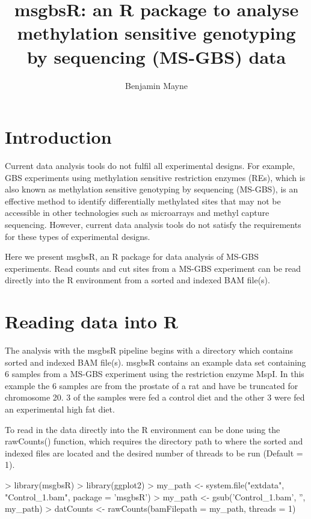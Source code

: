 \documentclass{article}
\begin{document}


\title{msgbsR: an R package to analyse methylation sensitive genotyping by sequencing (MS-GBS) data}
\author{Benjamin Mayne}
\maketitle

\tableofcontents

\clearpage

\section{Introduction}

Current data analysis tools do not fulfil all experimental designs. For example, GBS experiments using methylation sensitive restriction enzymes (REs), which is also known as methylation sensitive genotyping by sequencing (MS-GBS), is an effective method to identify differentially methylated sites that may not be accessible in other technologies such as microarrays and methyl capture sequencing. However, current data analysis tools do not satisfy the requirements for these types of experimental designs.

Here we present msgbsR, an R package for data analysis of MS-GBS experiments. Read counts and cut sites from a MS-GBS experiment can be read directly into the R environment from a sorted and indexed BAM file(s).

\section{Reading data into R}

The analysis with the msgbsR pipeline begins with a directory which contains sorted and indexed BAM file(s). msgbsR contains an example data set containing 6 samples from a MS-GBS experiment using the restriction enzyme MspI. In this example the 6 samples are from the prostate of a rat and have be truncated for chromosome 20. 3 of the samples were fed a control diet and the other 3 were fed an experimental high fat diet.

To read in the data directly into the R environment can be done using the rawCounts() function, which requires the directory path to where the sorted and indexed files are located and the desired number of threads to be run (Default = 1).

\begin{Schunk}
\begin{Sinput}
> library(msgbsR)
> library(ggplot2)
> my_path <- system.file("extdata", "Control_1.bam", package = 'msgbsR')
> my_path <- gsub('Control_1.bam', '', my_path)
> datCounts <- rawCounts(bamFilepath = my_path, threads = 1)
\end{Sinput}
\end{Schunk}
\end{document}
